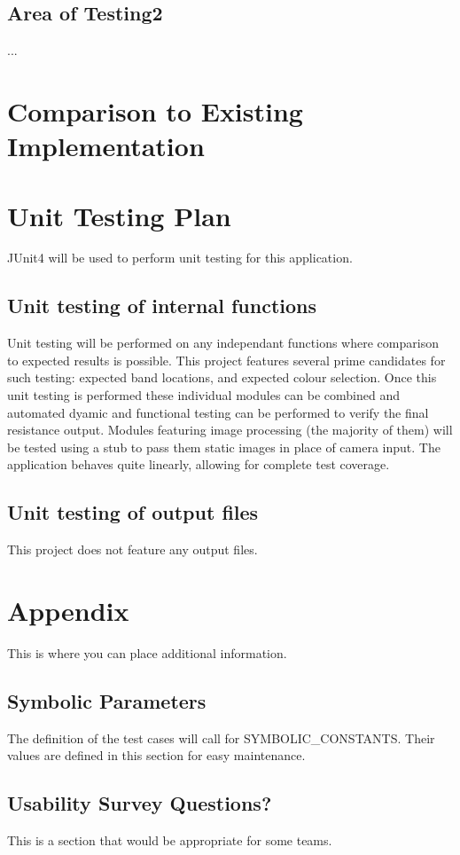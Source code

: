 \documentclass[12pt, titlepage]{article}
\begin{document}
\subsection{Area of Testing2}
...
	
\section{Comparison to Existing Implementation}	
				
\section{Unit Testing Plan}	
\par JUnit4 will be used to perform unit testing for this application.	
\subsection{Unit testing of internal functions}
\par Unit testing will be performed on any independant functions where comparison to expected results is possible. This project features several prime candidates for such testing: expected band locations, and expected colour selection. Once this unit testing is performed these individual modules can be combined and automated dyamic and functional testing can be performed to verify the final resistance output. Modules featuring image processing (the majority of them) will be tested using a stub to pass them static images in place of camera input. The application behaves quite linearly, allowing for complete test coverage.
\subsection{Unit testing of output files}		
\par This project does not feature any output files.


\newpage
\section{Appendix}
This is where you can place additional information.
\subsection{Symbolic Parameters}
The definition of the test cases will call for SYMBOLIC\_CONSTANTS.
Their values are defined in this section for easy maintenance.
\subsection{Usability Survey Questions?}
This is a section that would be appropriate for some teams.
\end{document}
